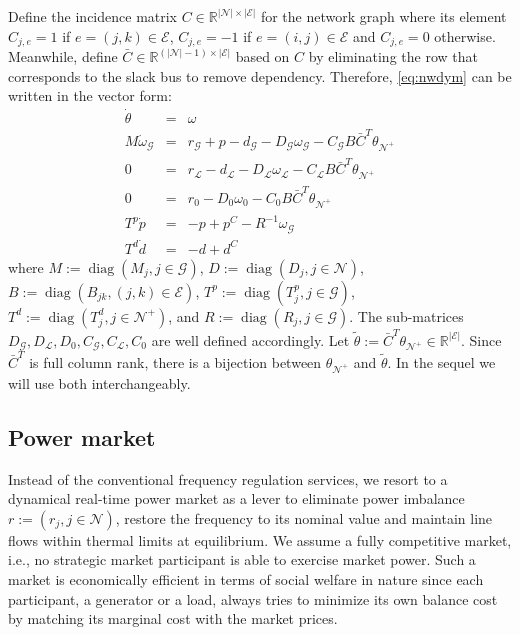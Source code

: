 \documentclass[journal,12pt,onecolumn,draftclsnofoot]{IEEEtran}
\newcommand{\diag}{\mathop{\mathrm{diag}}}
\begin{document}
Define the incidence matrix $C \in \mathbb{R}^{|\mathcal{N}|\times|\mathcal{E}|}$ for the network graph where its element $C_{j,e}=1$ if $e=(j,k)\in\mathcal{E}$, $C_{j,e}=-1$ if $e=(i,j)\in\mathcal{E}$ and $C_{j,e}=0$ otherwise. Meanwhile, define $\bar C \in \mathbb{R}^{(|\mathcal{N}|-1)\times|\mathcal{E}|}$ based on $C$ by eliminating the row that corresponds to the slack bus to remove dependency. 
Therefore, \eqref{eq:nwdym} can be written in the vector form:
  \begin{subequations}
  	\begin{eqnarray}
  	\label{eq:nwdymvec:1}
  	\dot \theta 	& = &  \omega \\
  	\label{eq:nwdymvec:2}
  	M \dot \omega_\mathcal{G} & = & r_\mathcal{G} +p  - d_\mathcal{G}  -D_\mathcal{G}  \omega_\mathcal{G}  - C_{\mathcal{G}}B  \bar C^T \theta_{\mathcal{N}^+} \\
  	\label{eq:nwdymvec:3}
  	0 & = & r_{\mathcal{L}} - d_{\mathcal{L}}  -D_{\mathcal{L}} \omega_{\mathcal{L}} - C_{\mathcal{L}}B \bar C^T\theta_{\mathcal{N}^+} \\
  	\label{eq:nwdymvec:4}
    0 & = & r_0 -D_0 \omega_0 - C_0 B \bar C^T\theta_{\mathcal{N}^+} \\
  	\label{eq:nwdymvec:5}
  	T^p \dot p & =  & -p+ p^C-R^{-1}\omega_{\mathcal{G}}  \\
  	\label{eq:nwdymvec:6}
  	T^d \dot d & =  & -d + d^C 
  	\end{eqnarray}\label{eq:nwdymvec}%
  \end{subequations}
where $M:=\diag(M_j,j\in\mathcal{G})$, $D:=\diag(D_j,j\in\mathcal{N})$, $B:=\diag(B_{jk},(j,k)\in\mathcal{E})$, $T^p:=\diag(T^p_j,j\in\mathcal{G})$, $T^d:=\diag(T^d_j,j\in\mathcal{N}^+)$, and $R:=\diag(R_j, j\in\mathcal{G})$. The sub-matrices $D_\mathcal{G},D_{\mathcal{L}},D_0,C_{\mathcal{G}},C_{\mathcal{L}},C_0$ are well defined accordingly.
Let $\tilde {\theta}:= \bar C^T \theta_{\mathcal{N}^+}\in\mathbb{R}^{|\mathcal{E}|}$. Since $\bar C^T$ is full column rank, there is a bijection between $\theta_{\mathcal{N}^+}$ and $\tilde{\theta}$. In the sequel we will use both interchangeably.


\subsection{Power market}

Instead of the conventional frequency regulation services, we resort to a dynamical real-time power market as a lever to eliminate power imbalance $r:=(r_j,j\in\mathcal{N})$, restore the frequency to its nominal value and maintain line flows within thermal limits at equilibrium. We assume a fully competitive market, i.e., no strategic market participant is able to exercise market power. Such a market is economically efficient in terms of social welfare in nature since each participant, a generator or a load, always tries to minimize its own balance cost by matching its marginal cost with the market prices.    
\end{document}
